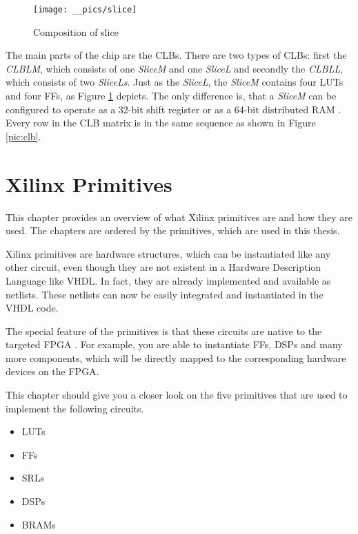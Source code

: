 \begin{center}

\begin{figure}[h]
\begin{center}
		\texttt{[image: \_\_pics/slice]}
		\caption{Composition of slice}
		\label{pic:slice}	
		\end{center}
	\end{figure} 
\end{center}

The main parts of the chip are the \acp{CLB}. There are two types of \acp{CLB}: first the \textit{CLBLM}, which consists of one \textit{SliceM} and one \textit{SliceL} and secondly the \textit{CLBLL}, which consists of two \textit{SliceLs}. Just as the \textit{SliceL}, the \textit{SliceM} contains four \acp{LUT} and four \acp{FF}, as Figure \ref{pic:slice} depicts. The only difference is, that a \textit{SliceM} can be configured to operate as a 32-bit shift register or as a 64-bit distributed RAM \cite{Description2009}. Every row in the \ac{CLB} matrix is in the same sequence as shown in Figure \ref{pic:clb}.

\section{Xilinx Primitives}
\label{sec:primitives}

This chapter provides an overview of what Xilinx primitives are and how they are used. The chapters are ordered by the primitives, which are used in this thesis. 

Xilinx primitives are hardware structures, which can be instantiated like any other circuit, even though they are not existent in a Hardware Description Language like \ac{VHDL}. In fact, they are already implemented and available as netlists. These netlists can now be easily integrated and instantiated in the \ac{VHDL} code. 

The special feature of the primitives is that these circuits are native to the targeted \ac{FPGA} \cite{Xilinx2010c}. For example, you are able to instantiate \acp{FF}, \acp{DSP} and many more components, which will be directly mapped to the corresponding hardware devices on the \ac{FPGA}. 

This chapter should give you a closer look on the five primitives that are used to implement the following circuits. 

\begin{itemize}
	\item \acp{LUT}
	\item \acp{FF}
	\item \acp{SRL}
	\item \acp{DSP}
	\item \acp{BRAM}
\end{itemize}

